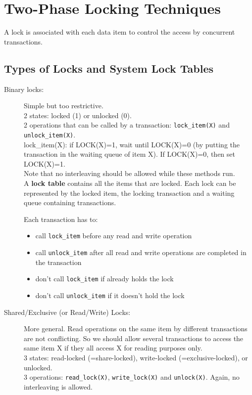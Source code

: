 \section{Two-Phase Locking Techniques}
A lock is associated with each data item to control the access by concurrent transactions.

\subsection{Types of Locks and System Lock Tables}
\begin{description}
    \item [Binary locks:] Simple but too restrictive.\\
        2 states: locked (1) or unlocked (0).\\
        2 operations that can be called by a transaction: \texttt{lock\_item(X)} and \texttt{unlock\_item(X)}.\\
            lock\_item(X): if LOCK(X)=1, wait until LOCK(X)=0 (by putting the transaction in the waiting queue of item X). If LOCK(X)=0, then set LOCK(X)=1.\\
        Note that no interleaving should be allowed while these methods run.\\
        
        A \textbf{lock table} contains all the items that are locked. Each lock can be represented by the locked item, the locking transaction and a waiting queue containing transactions.
        
        Each transaction has to:
        \begin{itemize}
            \item call \texttt{lock\_item} before any read and write operation
            \item call \texttt{unlock\_item} after all read and write operations are completed in the transaction
            \item don't call \texttt{lock\_item} if already holds the lock
            \item don't call \texttt{unlock\_item} if it doesn't hold the lock
        \end{itemize}
        
        
    \item [Shared/Exclusive (or Read/Write) Locks:] More general. Read operations on the same item by different transactions are not conflicting. So we should allow several transactions to access the same item X if they all access X for reading purposes only.\\
    3 states: read-locked (=share-locked), write-locked (=exclusive-locked), or unlocked.\\
    3 operations: \texttt{read\_lock(X)}, \texttt{write\_lock(X)} and \texttt{unlock(X)}. Again, no interleaving is allowed.\\
    

\end{description}
